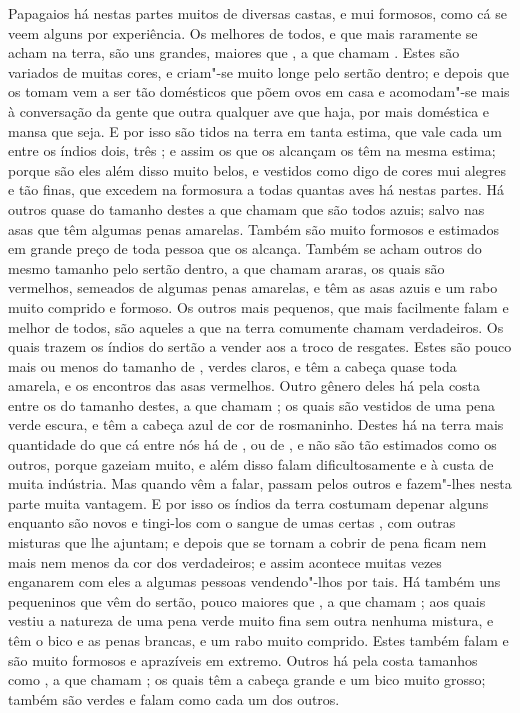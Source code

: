 Papagaios há nestas partes muitos de diversas castas, e mui formosos,			%
como cá se veem alguns por experiência. Os melhores de todos, e que mais
raramente se acham na terra, são uns grandes, maiores que , a que
chamam . Estes  são variados de muitas cores, e
criam"-se  muito longe pelo sertão dentro; e depois que os tomam vem a
ser tão domésticos que põem ovos em casa e acomodam"-se mais à
conversação da gente que outra qualquer ave que haja, por mais
doméstica e mansa que seja. E por isso são tidos na terra em tanta
estima, que vale cada um entre os índios dois, três ; e assim os   	%
 que os alcançam os têm na mesma estima; porque são eles
além disso muito belos, e vestidos como digo de cores mui alegres e tão
finas, que excedem na formosura a todas quantas aves há nestas partes.
Há outros quase do tamanho destes a que chamam  que são todos
azuis; salvo nas asas que têm algumas penas amarelas. Também são muito
formosos e estimados em grande preço de toda pessoa que os alcança.
Também se acham outros do mesmo tamanho pelo sertão dentro, a que
chamam araras, os quais são vermelhos, semeados de algumas penas amarelas,		%
e têm as asas azuis e um rabo muito comprido e formoso. Os outros mais
pequenos, que mais facilmente falam e melhor de todos, são aqueles a
que na terra comumente chamam  verdadeiros. Os quais trazem os
índios do sertão a vender aos  a troco de resgates. Estes		%
são pouco mais ou menos do tamanho de , verdes claros, e têm a
cabeça quase toda amarela, e os encontros das asas vermelhos. Outro
gênero deles há pela costa entre os  do tamanho destes, a
que chamam ; os quais são vestidos de uma pena verde escura, e
têm a cabeça azul de cor de rosmaninho. Destes  há na terra
mais quantidade do que cá entre nós há de , ou de , e não
são tão estimados como os outros, porque gazeiam muito, e além disso
falam dificultosamente e à custa de muita indústria. Mas quando vêm a
falar, passam pelos outros e fazem"-lhes nesta parte muita vantagem. E
por isso os índios da terra costumam depenar alguns enquanto são novos e tingi-los com o sangue de umas certas , com			%
outras misturas que lhe ajuntam; e depois que se tornam a cobrir de
pena ficam nem mais nem menos da cor dos verdadeiros; e assim acontece
muitas vezes enganarem com eles a algumas pessoas vendendo"-lhos por
tais. Há também uns pequeninos que vêm do sertão, pouco maiores que
, a que chamam ; aos quais vestiu a natureza de uma pena
verde muito fina sem outra nenhuma mistura, e têm o bico e as penas
brancas, e um rabo muito comprido. Estes também falam e são muito
formosos e aprazíveis em extremo. Outros há pela costa tamanhos como
, a que chamam ; os quais têm a cabeça grande e um bico
muito grosso; também são verdes e falam como cada um dos \mbox{outros.}

